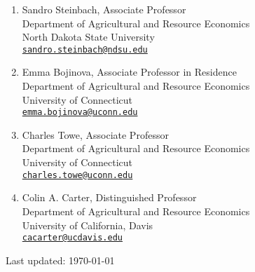 \documentclass[10.5 pt,letterpaper]{article}
\begin{document}
	\begin{enumerate}[leftmargin=0in]
		\item[] Sandro Steinbach, Associate Professor  \\
		Department of Agricultural and Resource Economics \\
		North Dakota State University \\
				\href{mailto:sandro.steinbach@ndsu.edu}{\texttt{sandro.steinbach@ndsu.edu}}
				
		\item[] Emma Bojinova, Associate Professor in Residence \\
Department of Agricultural and Resource Economics \\
University of Connecticut \\
\href{mailto:emma.bojinova@uconn.edu}{\texttt{emma.bojinova@uconn.edu}}

		
 
 
 \item[] Charles Towe, Associate Professor \\
Department of Agricultural and Resource Economics \\
University of Connecticut \\
 \href{mailto:charles.towe@uconn.edu}{\texttt{charles.towe@uconn.edu}}
 
		

				\item[] Colin A. Carter, Distinguished Professor \\
		Department of Agricultural and Resource Economics \\
		University of California, Davis \\
				\href{mailto:cacarter@ucdavis.edu}{\texttt{cacarter@ucdavis.edu}}
		
		
	\end{enumerate}
\vfill
			
	\bigskip
	\bigskip 
	\begin{center}
		\begin{footnotesize}
		\raggedleft	Last updated: \today \\
		\end{footnotesize}
	\end{center}
	
\end{document}
